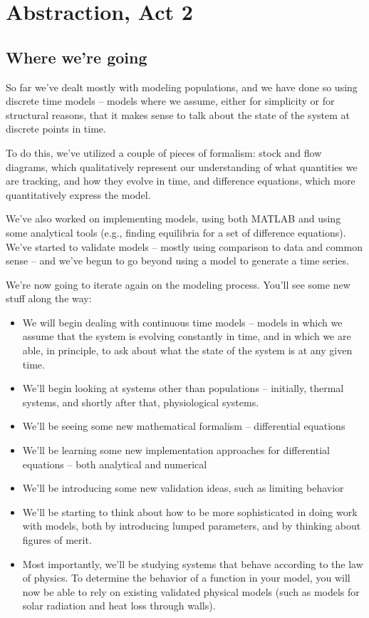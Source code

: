 
\chapter{Abstraction, Act 2}

\section{Where we're going}

So far we've dealt mostly with modeling populations, and we have done
so using discrete time models -- models where we assume, either for
simplicity or for structural reasons, that it makes sense to talk
about the state of the system at discrete points in time.

To do this, we've utilized a couple of pieces of formalism: stock and
flow diagrams, which qualitatively represent our understanding of what
quantities we are tracking, and how they evolve in time, and
difference equations, which more quantitatively express the model.

We've also worked on implementing models, using both MATLAB and using
some analytical tools (e.g., finding equilibria for a set of
difference equations). We've started to validate models -- mostly
using comparison to data and common sense -- and we've begun to go
beyond using a model to generate a time series.

We're now going to iterate again on the modeling process.  You'll see
some new stuff along the way:

\begin{itemize}
\item We will begin dealing with continuous time models -- models in which we assume that the system is evolving constantly in time, and in which we are able, in principle, to ask about what the state of the system is at any given time.
\item We'll begin looking at systems other than populations -- initially, thermal systems, and shortly after that, physiological systems.
\item We'll be seeing some new mathematical formalism -- differential equations
\item We'll be learning some new implementation approaches for differential equations -- both analytical and numerical
\item We'll be introducing some new validation ideas, such as limiting behavior
\item We'll be starting to think about how to be more sophisticated in doing work with models, both by introducing lumped parameters, and by thinking about figures of merit.
\item Most importantly, we'll be studying systems that behave according to the law of physics.  To determine the behavior of a function in your model, you will now be able to rely on existing validated physical models (such as models for solar radiation and heat loss through walls). 
\end{itemize}

